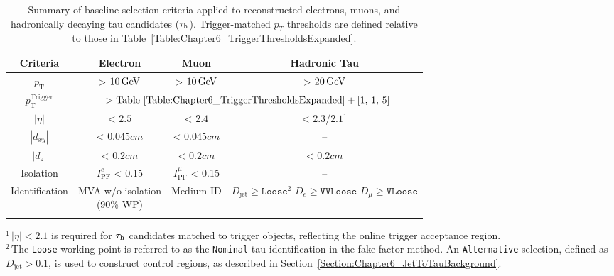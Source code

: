 {
\setlength{\arrayrulewidth}{1pt}

\begin{table}[h]
\centering
\caption[Summary of baseline object selection criteria]{
Summary of baseline selection criteria applied to reconstructed electrons, muons, and hadronically decaying tau candidates ($\tau_\mathrm{h}$). Trigger-matched $p_T$ thresholds are defined relative to those in Table~\ref{Table:Chapter6_TriggerThresholdsExpanded}.
}
\label{Table:Chapter6_ObjectSelectionSummary}

\renewcommand{\arraystretch}{1.5}
\setlength{\tabcolsep}{12pt}

\begin{tabular}{cccc}
\hline
\textbf{Criteria} & \textbf{Electron} & \textbf{Muon} & \textbf{Hadronic Tau} \\
\hline

$p_\text{T}$  & > $10\,\text{Ge\hspace{-.08em}V}$ & > $10\,\text{Ge\hspace{-.08em}V}$ & > $20\,\text{Ge\hspace{-.08em}V}$\\ 
\arrayrulecolor{lightgray} \hline

$p_\text{T}^{\text{Trigger}}$ & \multicolumn{3}{c}{$> \text{Table~\ref{Table:Chapter6_TriggerThresholdsExpanded}} + [1,\,1,\,5]$} \\
\arrayrulecolor{lightgray} \hline

$|\eta|$ & < $2.5$ & < $2.4$ & < $2.3$/$2.1$\hyperlink{DoubleTauTrigger-EtaCut}{$^1$} \\
\arrayrulecolor{lightgray} \hline

$|d_{xy}|$ & < $0.045\unit{cm}$ & < $0.045\unit{cm}$ & -- \\
\arrayrulecolor{lightgray} \hline

$|d_z|$ & < $0.2\unit{cm}$ & < $0.2\unit{cm}$ & < $0.2\unit{cm}$ \\
\arrayrulecolor{lightgray} \hline

Isolation & $I^e_\text{PF}$ < 0.15 & $I^\mu_\text{PF}$ < 0.15 & -- \\
\arrayrulecolor{lightgray} \hline

Identification
& \makecell{MVA w/o isolation\\(90\% WP)}
& Medium ID
& \makecell{
$D_{\text{jet}} \geq \texttt{Loose}$\hyperlink{Alternative-FFcut}{$^2$} \\
$D_{e} \geq \texttt{VVLoose}$ \\
$D_{\mu} \geq \texttt{VLoose}$
} \\
\arrayrulecolor{black} \hline
\end{tabular}
\vspace{0.5em}
\begin{minipage}{0.95\linewidth}
\raggedright
\footnotesize
\hypertarget{DoubleTauTrigger-EtaCut}{}$^{1}$\,$|\eta| < 2.1$ is required for $\tau_\mathrm{h}$ candidates matched to trigger objects, reflecting the online trigger acceptance region. \\
\hypertarget{Alternative-FFcut}{}$^{2}$\,The \texttt{Loose} working point is referred to as the \texttt{Nominal} tau identification in the fake factor method. An \texttt{Alternative} selection, defined as $D_{\text{jet}} > 0.1$, is used to construct control regions, as described in Section~\ref{Section:Chapter6_JetToTauBackground}.


\end{minipage}
\end{table}}
